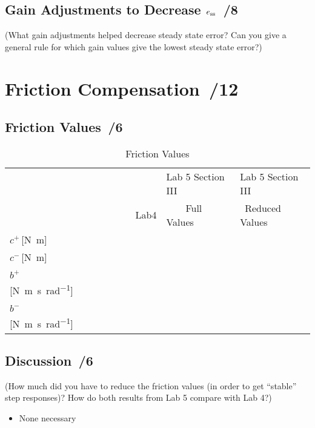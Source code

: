 \documentclass{article}
\newcommand{\score}{\hfill \underline{\hspace{0.65cm}}\,/} %
\begin{document}
\subsection{Gain Adjustments to Decrease $e_{\rm ss}$ \score 8}
(What gain adjustments helped decrease steady state error? Can you give a general rule for which gain values give the lowest steady state error?)

\section{Friction Compensation \score 12}
\subsection{Friction Values \score 6}
\begin{table}[phtb]\footnotesize
\begin{center}
\caption{Friction Values}
 \label{tbl:lab5_q4}
\begin{tabular}{l|m{2.5cm}|m{2.5cm}|m{2.5cm}} \hline \hline
\cellcolor{lightgray} &\cellcolor{lightgray}  &\cellcolor{lightgray} Lab 5 Section III & \cellcolor{lightgray} Lab 5 Section III \\
\cellcolor{lightgray}&\multirow{-2}{*}{\cellcolor{lightgray}~~~~~~~~~Lab4} & \cellcolor{lightgray}~~~~Full Values &\cellcolor{lightgray} ~Reduced Values \\
\hline
$c^+$\,[\si{\newton\meter}] & & &  \\ \hline
$c^-$\,[\si{\newton\meter}] & & &  \\ \hline
$b^+$\,[\si{\newton\meter\second\per\radian}] & & & \\ \hline
$b^-$\,[\si{\newton\meter\second\per\radian}] & & & \\ \hline
\end{tabular}
\end{center}
\end{table}

\subsection{Discussion \score 6}
(How much did you have to reduce the friction values (in order to get ``stable'' step responses)? How do both results from Lab 5 compare with Lab 4?)
\newline \\[3mm]
\begin{itemize}
\item None necessary %
\end{itemize}
\end{document}
